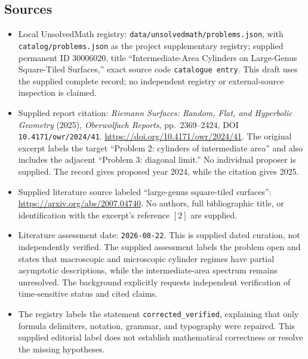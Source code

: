 \documentclass[11pt]{article}
\begin{document}
\subsection{Sources}
\begin{itemize}
\item Local UnsolvedMath registry: \texttt{data/unsolvedmath/problems.json}, with \texttt{catalog/problems.json} as the project supplementary registry; supplied permanent ID \(30006020\), title ``Intermediate-Area Cylinders on Large-Genus Square-Tiled Surfaces,'' exact source code \texttt{catalogue entry}. This draft uses the supplied complete record; no independent registry or external-source inspection is claimed.
\item Supplied report citation: \emph{Riemann Surfaces: Random, Flat, and Hyperbolic Geometry} (2025), \emph{Oberwolfach Reports}, pp.\ 2369--2424, DOI \texttt{10.4171/owr/2024/41}. \url{https://doi.org/10.4171/owr/2024/41}. The original excerpt labels the target ``Problem 2: cylinders of intermediate area'' and also includes the adjacent ``Problem 3: diagonal limit.'' No individual proposer is supplied. The record gives proposed year 2024, while the citation gives 2025.
\item Supplied literature source labeled ``large-genus square-tiled surfaces'': \url{https://arxiv.org/abs/2007.04740}. No authors, full bibliographic title, or identification with the excerpt's reference \([2]\) are supplied.
\item Literature assessment date: \texttt{2026-08-22}. This is supplied dated curation, not independently verified. The supplied assessment labels the problem open and states that macroscopic and microscopic cylinder regimes have partial asymptotic descriptions, while the intermediate-area spectrum remains unresolved. The background explicitly requests independent verification of time-sensitive status and cited claims.
\item The registry labels the statement \texttt{corrected\_verified}, explaining that only formula delimiters, notation, grammar, and typography were repaired. This supplied editorial label does not establish mathematical correctness or resolve the missing hypotheses.
\end{itemize}
\end{document}
